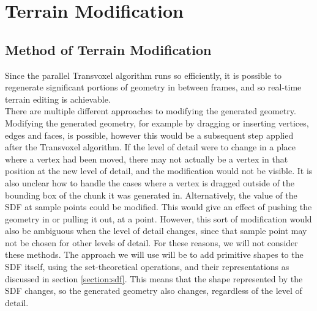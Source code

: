 \documentclass{article}
\begin{document}
\section{Terrain Modification}
\subsection{Method of Terrain Modification}
Since the parallel Transvoxel algorithm runs so efficiently, it is possible to regenerate significant portions of geometry in between frames, and so real-time terrain editing is achievable.\\
There are multiple different approaches to modifying the generated geometry. Modifying the generated geometry, for example by dragging or inserting vertices, edges and faces, is possible, however this would be a subsequent step applied after the Transvoxel algorithm. If the level of detail were to change in a place where a vertex had been moved, there may not actually be a vertex in that position at the new level of detail, and the modification would not be visible. It is also unclear how to handle the cases where a vertex is dragged outside of the bounding box of the chunk it was generated in. Alternatively, the value of the SDF at sample points could be modified. This would give an effect of pushing the geometry in or pulling it out, at a point. However, this sort of modification would also be ambiguous when the level of detail changes, since that sample point may not be chosen for other levels of detail. For these reasons, we will not consider these methods. The approach we will use will be to add primitive shapes to the SDF itself, using the set-theoretical operations, and their representations as discussed in section \ref{section:sdf}. This means that the shape represented by the SDF changes, so the generated geometry also changes, regardless of the level of detail.
\end{document}
